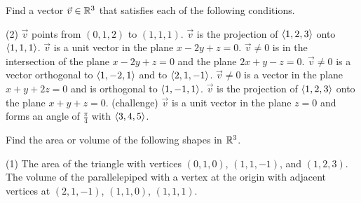 \documentclass{discussion}
\author{Sections B04 and B06}
\date{Fall 2024}
\begin{document}
\begin{question}
    Find a vector \(\vec{v}\in \mathbb{R}^3\) that satisfies each of the following conditions.
    \begin{tasks}(2)
        \task \(\vec{v}\) points from \((0, 1, 2)\) to \((1, 1, 1)\).
        \task \(\vec{v}\) is the projection of \(\langle1, 2, 3\rangle\) onto \(\langle1, 1, 1\rangle\).
        \task \(\vec{v}\) is a unit vector in the plane \(x - 2y + z = 0\).
        \task \(\vec{v}\neq 0\) is in the intersection of the plane \(x - 2y + z = 0\) and the plane \(2x + y - z = 0\).
        \task \(\vec{v}\neq 0\) is a vector orthogonal to \(\langle1, -2, 1\rangle\) and to \(\langle2, 1, -1\rangle\).
        \task \(\vec{v}\neq 0\) is a vector in the plane \(x + y + 2z = 0\) and is orthogonal to \(\langle1, -1, 1\rangle\).
        \task \(\vec{v}\) is the projection of \(\langle1, 2, 3\rangle\) onto the plane \(x + y + z = 0\).
        \task (challenge) \(\vec{v}\) is a unit vector in the plane \(z = 0\) and forms an angle of \(\frac{\pi}{4}\) with \(\langle3, 4, 5\rangle\).
    \end{tasks}
\end{question}

\vspace{70pt}

\begin{question}
    Find the area or volume of the following shapes in \(\mathbb{R}^3\).
    \begin{tasks}(1)
        \task The area of the triangle with vertices \((0, 1, 0)\), \((1, 1, -1)\), and \((1, 2, 3)\).
        \task The volume of the parallelepiped with a vertex at the origin with adjacent vertices at \((2, 1, -1)\), \((1, 1, 0)\), \((1, 1, 1)\).
    \end{tasks}
\end{question}
\end{document}

